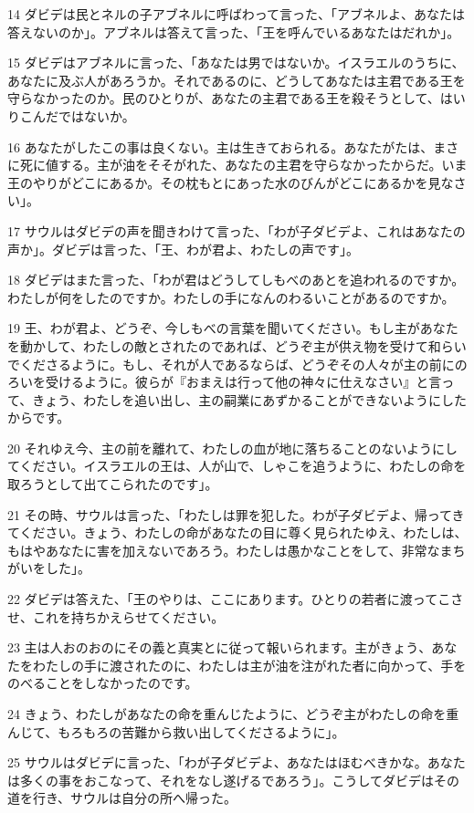 \par 14 ダビデは民とネルの子アブネルに呼ばわって言った、「アブネルよ、あなたは答えないのか」。アブネルは答えて言った、「王を呼んでいるあなたはだれか」。
\par 15 ダビデはアブネルに言った、「あなたは男ではないか。イスラエルのうちに、あなたに及ぶ人があろうか。それであるのに、どうしてあなたは主君である王を守らなかったのか。民のひとりが、あなたの主君である王を殺そうとして、はいりこんだではないか。
\par 16 あなたがしたこの事は良くない。主は生きておられる。あなたがたは、まさに死に値する。主が油をそそがれた、あなたの主君を守らなかったからだ。いま王のやりがどこにあるか。その枕もとにあった水のびんがどこにあるかを見なさい」。
\par 17 サウルはダビデの声を聞きわけて言った、「わが子ダビデよ、これはあなたの声か」。ダビデは言った、「王、わが君よ、わたしの声です」。
\par 18 ダビデはまた言った、「わが君はどうしてしもべのあとを追われるのですか。わたしが何をしたのですか。わたしの手になんのわるいことがあるのですか。
\par 19 王、わが君よ、どうぞ、今しもべの言葉を聞いてください。もし主があなたを動かして、わたしの敵とされたのであれば、どうぞ主が供え物を受けて和らいでくださるように。もし、それが人であるならば、どうぞその人々が主の前にのろいを受けるように。彼らが『おまえは行って他の神々に仕えなさい』と言って、きょう、わたしを追い出し、主の嗣業にあずかることができないようにしたからです。
\par 20 それゆえ今、主の前を離れて、わたしの血が地に落ちることのないようにしてください。イスラエルの王は、人が山で、しゃこを追うように、わたしの命を取ろうとして出てこられたのです」。
\par 21 その時、サウルは言った、「わたしは罪を犯した。わが子ダビデよ、帰ってきてください。きょう、わたしの命があなたの目に尊く見られたゆえ、わたしは、もはやあなたに害を加えないであろう。わたしは愚かなことをして、非常なまちがいをした」。
\par 22 ダビデは答えた、「王のやりは、ここにあります。ひとりの若者に渡ってこさせ、これを持ちかえらせてください。
\par 23 主は人おのおのにその義と真実とに従って報いられます。主がきょう、あなたをわたしの手に渡されたのに、わたしは主が油を注がれた者に向かって、手をのべることをしなかったのです。
\par 24 きょう、わたしがあなたの命を重んじたように、どうぞ主がわたしの命を重んじて、もろもろの苦難から救い出してくださるように」。
\par 25 サウルはダビデに言った、「わが子ダビデよ、あなたはほむべきかな。あなたは多くの事をおこなって、それをなし遂げるであろう」。こうしてダビデはその道を行き、サウルは自分の所へ帰った。

